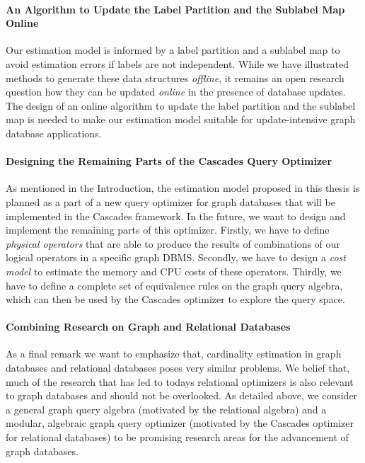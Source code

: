 \paragraph{An Algorithm to Update the Label Partition and the Sublabel Map
           Online}

Our estimation model is informed by a label partition and a sublabel map to
avoid estimation errors if labels are not independent. While we have illustrated
methods to generate these data structures \emph{offline}, it remains an open
research question how they can be updated \emph{online} in the presence of
database updates.
The design of an online algorithm to update the label partition and the
sublabel map is needed to make our estimation model suitable for
update-intensive graph database applications.

\paragraph{Designing the Remaining Parts of the Cascades Query Optimizer}

As mentioned in the Introduction, the estimation model proposed in this thesis
is planned as a part of a new query optimizer for graph databases that will be
implemented in the Cascades framework\cite{graefe_cascades_1995}.
In the future, we want to design and implement the remaining parts of this
optimizer. Firstly, we have to define \emph{physical operators} that are
able to produce the results of combinations of our logical operators in a
specific graph DBMS.
Secondly, we  have to design a \emph{cost model} to estimate the
memory and CPU costs of these operators.
Thirdly, we have to define a complete set of equivalence rules on the
graph query algebra, which can then be used by the Cascades optimizer to
explore the query space.

\paragraph{Combining Research on Graph and Relational Databases}

As a final remark we want to emphasize that,
cardinality estimation in graph databases
and relational databases poses very similar problems. We belief that, much of
the research that has led to todays relational optimizers is also relevant to
graph databases and should not be overlooked. As detailed above, we consider a
general graph query algebra
(motivated by the relational algebra) and a modular, algebraic graph query
optimizer (motivated by the Cascades optimizer for relational databases)
to be promising research areas for the advancement of graph databases.

